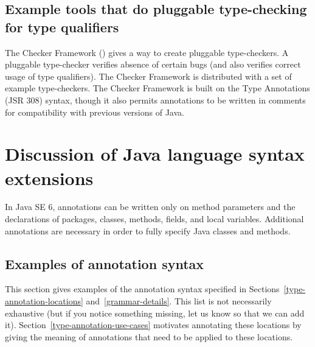 \documentclass[10pt]{article}
\begin{document}
\subsection{Example tools that do pluggable type-checking for type qualifiers\label{type-qualifier-tools}}

The Checker Framework
()
gives a way to create pluggable type-checkers.  A pluggable type-checker
verifies absence of certain bugs (and also verifies correct usage of type
qualifiers).  The Checker Framework is distributed with a set of example
type-checkers.  The Checker Framework is built on the Type Annotations (JSR
308) syntax, though it also permits annotations to be written in comments
for compatibility with previous versions of Java.



\section{Discussion of Java language syntax extensions\label{syntax-discussion}}

In Java SE 6, annotations can be written only on method parameters
and the declarations of packages, classes, methods, fields, and local variables.
Additional annotations are necessary in order to fully specify Java classes and
methods.


\subsection{Examples of annotation syntax\label{type-annotation-syntax-examples}}

This section gives examples of the annotation syntax specified in
Sections~\ref{type-annotation-locations} and~\ref{grammar-details}.
This list is not necessarily exhaustive (but if you notice something
missing, let us know so that we can add it).
Section~\ref{type-annotation-use-cases} motivates annotating these
locations by giving the meaning of annotations that need to be applied to
these locations.


\newcommand{\preverbnegspace}{\vspace{-5pt}}

\end{document}

